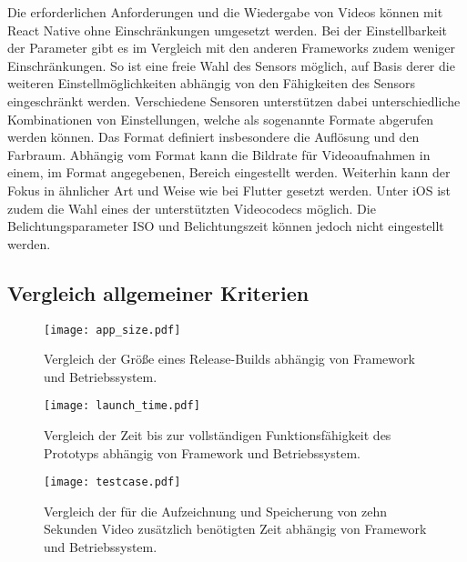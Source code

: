 Die erforderlichen Anforderungen und die Wiedergabe von Videos können mit React Native ohne Einschränkungen umgesetzt werden.
Bei der Einstellbarkeit der Parameter gibt es im Vergleich mit den anderen Frameworks zudem weniger Einschränkungen.
So ist eine freie Wahl des Sensors möglich, auf Basis derer die weiteren Einstellmöglichkeiten abhängig von den Fähigkeiten des Sensors eingeschränkt werden.
Verschiedene Sensoren unterstützen dabei unterschiedliche Kombinationen von Einstellungen, welche als sogenannte Formate abgerufen werden können.
Das Format definiert insbesondere die Auflösung und den Farbraum.
Abhängig vom Format kann die Bildrate für Videoaufnahmen in einem, im Format angegebenen, Bereich eingestellt werden.
Weiterhin kann der Fokus in ähnlicher Art und Weise wie bei Flutter gesetzt werden.
Unter iOS ist zudem die Wahl eines der unterstützten Videocodecs möglich.
Die Belichtungsparameter ISO und Belichtungszeit können jedoch nicht eingestellt werden.


\subsection{Vergleich allgemeiner Kriterien}


\begin{figure}[ht]
  \centering 
  \texttt{[image: app\_size.pdf]}
  \caption{Vergleich der Größe eines Release-Builds abhängig von Framework und Betriebssystem.}
  \label{fig:app_size}
\end{figure}

\begin{figure}[ht]
  \centering 
  \texttt{[image: launch\_time.pdf]}
  \caption{Vergleich der Zeit bis zur vollständigen Funktionsfähigkeit des Prototyps abhängig von Framework und Betriebssystem.}
  \label{fig:launch_time}
\end{figure}

\begin{figure}[ht]
  \centering 
  \texttt{[image: testcase.pdf]}
  \caption{Vergleich der für die Aufzeichnung und Speicherung von zehn Sekunden Video zusätzlich benötigten Zeit abhängig von Framework und Betriebssystem.}
  \label{fig:testcase}
\end{figure}